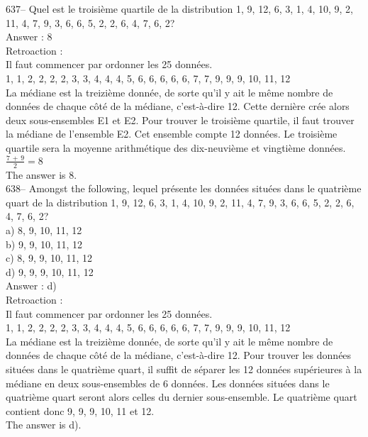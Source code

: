 ﻿\documentclass[letterpaper, 12pt]{article}
\begin{document}
637--  Quel est le troisi\`eme quartile de la distribution 1, 9, 12, 6, 3,
1, 4, 10, 9, 2, 11, 4, 7, 9, 3, 6, 6, 5, 2, 2, 6, 4, 7, 6, 2?\\

Answer : 8\\

Retroaction : \\
Il faut commencer par ordonner les 25 donn\'ees.\\
1, 1, 2, 2, 2, 2, 3, 3, 4, 4, 4, 5, 6, 6, 6, 6, 6, 7, 7, 9, 9, 9, 10, 11,
12\\
La m\'ediane est la treizi\`eme donn\'ee, de sorte qu'il y ait le m\^eme
nombre de donn\'ees de chaque c\^ot\'e de la m\'ediane, c'est-\`a-dire 12.
Cette derni\`ere cr\'ee alors deux sous-ensembles E1 et E2.  Pour trouver le
troisi\`eme quartile, il faut trouver la m\'ediane de l'ensemble E2.  Cet
ensemble compte 12 donn\'ees.  Le troisi\`eme quartile sera la moyenne
arithm\'etique des dix-neuvi\`eme et vingti\`eme donn\'ees.  \\[2mm]
$\frac{7\,+\,9}{2}=8$\\[2mm]
The answer is 8.\\

638--  Amongst the following, lequel pr\'esente les donn\'ees
situ\'ees dans le quatri\`eme quart de la distribution 1, 9, 12, 6, 3, 1, 4,
10, 9, 2, 11, 4, 7, 9, 3, 6, 6, 5, 2, 2, 6, 4, 7, 6, 2?\\
a) 8, 9, 10, 11, 12\\
b) 9, 9, 10, 11, 12\\
c) 8, 9, 9, 10, 11, 12\\
d) 9, 9, 9, 10, 11, 12\\

Answer : d)\\

Retroaction : \\
Il faut commencer par ordonner les 25 donn\'ees.\\
1, 1, 2, 2, 2, 2, 3, 3, 4, 4, 4, 5, 6, 6, 6, 6, 6, 7, 7, 9, 9, 9, 10, 11,
12\\
La m\'ediane est la treizi\`eme donn\'ee, de sorte qu'il y ait le m\^eme
nombre de donn\'ees de chaque c\^ot\'e de la m\'ediane, c'est-\`a-dire 12.
Pour trouver les donn\'ees situ\'ees dans le quatri\`eme quart, il suffit de
s\'eparer les 12 donn\'ees sup\'erieures \`a la m\'ediane en deux
sous-ensembles de 6 donn\'ees.  Les donn\'ees situ\'ees dans le quatri\`eme
quart seront alors celles du dernier sous-ensemble. Le quatri\`eme quart
contient donc 9, 9, 9, 10, 11 et 12.\\
The answer is d). \\
\end{document}
